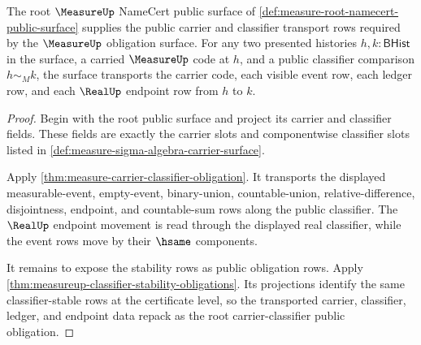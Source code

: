 \begin{theorem}
\label{thm:measure-root-carrier-classifier-public-obligation}
The root $\MeasureUp$ NameCert public surface of
\autoref{def:measure-root-namecert-public-surface} supplies the public carrier
and classifier transport rows required by the $\MeasureUp$ obligation surface.
For any two presented histories $h,k:\mathsf{BHist}$ in the surface, a carried
$\MeasureUp$ code at $h$, and a public classifier comparison $h\sim_M k$, the
surface transports the carrier code, each visible event row, each ledger row,
and each $\RealUp$ endpoint row from $h$ to $k$.
\end{theorem}
\begin{proof}
Begin with the root public surface and project its carrier and classifier
fields. These fields are exactly the carrier slots and componentwise
classifier slots listed in
\autoref{def:measure-sigma-algebra-carrier-surface}.

Apply \autoref{thm:measure-carrier-classifier-obligation}. It transports the
displayed measurable-event, empty-event, binary-union, countable-union,
relative-difference, disjointness, endpoint, and countable-sum rows along the
public classifier. The $\RealUp$ endpoint movement is read through the
displayed real classifier, while the event rows move by their $\hsame$
components.

It remains to expose the stability rows as public obligation rows. Apply
\autoref{thm:measureup-classifier-stability-obligations}. Its projections
identify the same classifier-stable rows at the certificate level, so the
transported carrier, classifier, ledger, and endpoint data repack as the
root carrier-classifier public obligation.
\end{proof}

